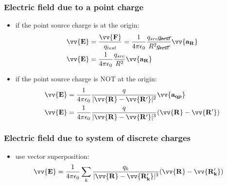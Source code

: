 \documentclass[10pt]{article}
\begin{document}
\subsubsection{Electric field due to a point charge}
\begin{itemize}
    \item if the point source charge is at the origin:
    \begin{align}
        \vv{\mathbf{E}} &= \frac{\vv{\mathbf{F}}}{q_{test}} = \frac{1}{4\pi\epsilon_0} \frac{q_{src}\cancel{q_{test}}}{R^2 \cancel{q_{test}}} \vv{\mathbf{a_R}} \\
        \vv{\mathbf{E}} &= \frac{1}{4\pi\epsilon_0} \frac{q_{src}}{R^2} \vv{\mathbf{a_R}}
    \end{align}
    \item if the point source charge is NOT at the origin: 
    \begin{align}
        \vv{\mathbf{E}} &= \frac{1}{4\pi\epsilon_0} \frac{q}{|\vv{\mathbf{R}} - \vv{\mathbf{R'}}|^2} \vv{\mathbf{a_{qp}}} \\
        \vv{\mathbf{E}} &= \frac{1}{4\pi\epsilon_0} \frac{q}{|\vv{\mathbf{R}} - \vv{\mathbf{R'}}|^3} (\vv{\mathbf{R}} - \vv{\mathbf{R'}})  
    \end{align}
\end{itemize}

\subsubsection{Electric field due to system of discrete charges}
\begin{itemize}
    \item use vector superposition:
    \begin{align}
        \vv{\mathbf{E}} &= \frac{1}{4\pi\epsilon_0} \sum_{k} \frac{q_k}{|\vv{\mathbf{R}} - \vv{\mathbf{R'_k}}|^3} (\vv{\mathbf{R}} - \vv{\mathbf{R'_k}})  
    \end{align}
\end{itemize}
\end{document}
